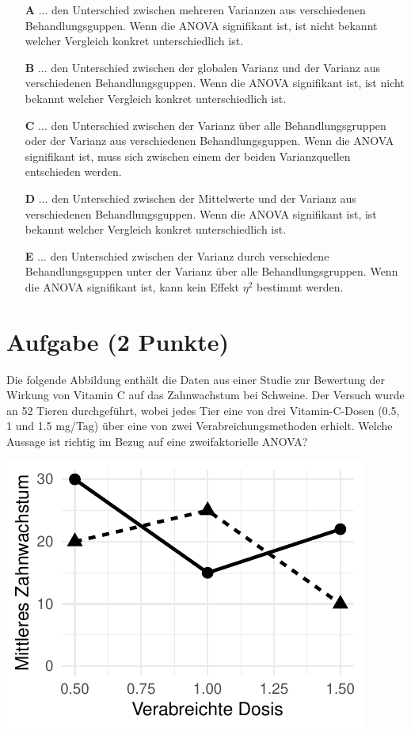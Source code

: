 \documentclass[a4paper, 9pt]{scrartcl}\usepackage[]{graphicx}\usepackage[]{xcolor}
\makeatletter
\def\maxwidth{ %
  \ifdim\Gin@nat@width>\linewidth
    \linewidth
  \else
    \Gin@nat@width
  \fi
}
\makeatother
\begin{document}
\begin{enumerate}
\item [\textbf{A} \msquare] ... den Unterschied zwischen mehreren Varianzen aus verschiedenen Behandlungsguppen. Wenn die ANOVA signifikant ist, ist nicht bekannt welcher Vergleich konkret unterschiedlich ist.
\item [\textbf{B} \msquare] ... den Unterschied zwischen der globalen Varianz und der Varianz aus verschiedenen Behandlungsguppen. Wenn die ANOVA signifikant ist, ist nicht bekannt welcher Vergleich konkret unterschiedlich ist.
\item [\textbf{C} \msquare] ... den Unterschied zwischen der Varianz über alle Behandlungsgruppen oder der Varianz aus verschiedenen Behandlungsguppen. Wenn die ANOVA signifikant ist, muss sich zwischen einem der beiden Varianzquellen entschieden werden.
\item [\textbf{D} \msquare] ... den Unterschied zwischen der Mittelwerte und der Varianz aus verschiedenen Behandlungsguppen. Wenn die ANOVA signifikant ist, ist bekannt welcher Vergleich konkret unterschiedlich ist.
\item [\textbf{E} \msquare] ... den Unterschied zwischen der Varianz durch verschiedene Behandlungsguppen unter der Varianz über alle Behandlungsgruppen. Wenn die ANOVA signifikant ist, kann kein Effekt $\eta^2$ bestimmt werden.
\end{enumerate} 

\section{Aufgabe \hfill (2 Punkte)}



Die folgende Abbildung enthält die Daten aus einer Studie zur Bewertung der Wirkung von Vitamin C auf das Zahnwachstum bei Schweine. Der Versuch wurde an 52 Tieren durchgeführt, wobei jedes Tier eine von  drei Vitamin-C-Dosen (0.5, 1 und 1.5 mg/Tag) über eine von zwei Verabreichungsmethoden erhielt. Welche Aussage ist richtig im Bezug auf eine zweifaktorielle ANOVA?



{\centering \includegraphics[width=\maxwidth]{img/mc-anova-02-a-1} 

}
\end{document}
